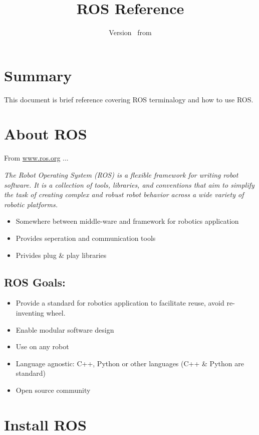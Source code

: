 \documentclass{scrartcl}
\newcommand{\docTitle}{ROS Reference}
\begin{document}
\title{\docTitle}
\author{\vhListAllAuthors}
\date{Version \vhCurrentVersion\ from \vhCurrentDate}
\maketitle

\section{Summary}
This document is brief reference covering ROS terminalogy and how to use ROS.

\section{About ROS}
\label{sec:install_ros}

From \href{http://www.ros.org/about-ros/}{www.ros.org} ...

\textit{The Robot Operating System (ROS) is a flexible framework for writing robot software. It is a collection of tools, libraries, and conventions that aim to simplify the task of creating complex and robust robot behavior across a wide variety of robotic platforms.} \\

\begin{itemize}
	\item Somewhere between middle-ware and framework for robotics application
	\item Provides seperation and communication tools
	\item Privides plug \& play libraries
\end{itemize}

\subsection{ROS Goals:}
\begin{itemize}
	\item Provide a standard for robotics application to facilitate reuse, avoid re-inventing wheel.
	\item Enable modular software design
	\item Use on any robot
	\item Language agnostic: C++, Python or other languages (C++ \& Python are standard)
	\item Open source community
\end{itemize}

\section{Install ROS}
\label{sec:install_ros}
\end{document}
